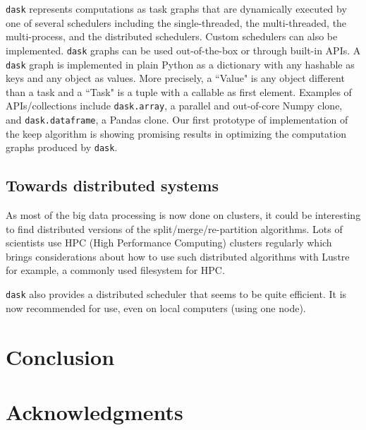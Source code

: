 \documentclass[sigconf, nonacm]{acmart}
\begin{document}
\texttt{dask} represents computations as task graphs that are dynamically executed by one
of several schedulers including the single-threaded, the multi-threaded, the
multi-process, and the distributed schedulers. Custom schedulers can also be
implemented. \texttt{dask} graphs can be used out-of-the-box or through
built-in APIs. A \texttt{dask} graph is implemented in plain Python as a
dictionary with any hashable as keys and any object as values. More precisely,
a ``Value" is any object different than a task and a ``Task" is a tuple with a
callable as first element. Examples of APIs/collections include
\texttt{dask.array}, a parallel and out-of-core
Numpy clone, and \texttt{dask.dataframe}, a Pandas clone.
Our first prototype of implementation of the keep algorithm is showing promising
results in optimizing the computation graphs produced by \texttt{dask}.

\subsection{Towards distributed systems}
As most of the big data processing is now done on clusters, it could be interesting
to find distributed versions of the split/merge/re-partition algorithms.
Lots of scientists use HPC (High Performance Computing) clusters regularly which
brings considerations about how to use such distributed algorithms with Lustre
for example, a commonly used filesystem for HPC.

\texttt{dask} also provides a distributed scheduler that seems to be quite
efficient.
It is now recommended for use, even on local computers (using one node).

\section{Conclusion}

\section{Acknowledgments}



\end{document}
